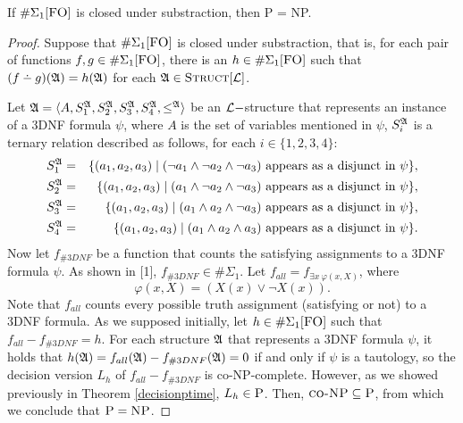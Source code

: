 \begin{theo}
If $\E1$ is closed under substraction, then {\sc P} = {\sc NP}.
\end{theo}
\begin{proof}
Suppose that $\E1$ is closed under substraction, that is, for each pair of functions $f,g\in \E1$, there is an $h\in\E1$ such that $(f\dotminus g)(\A) = h(\A)$ for each ${\frak A}\in\textsc{Struct}[{\cal L}]$.

Let ${\frak A} = \langle A, S_1^{\frak A}, S_2^{\frak A}, S_3^{\frak A}, S_4^{\frak A}, \leq^{\frak A} \rangle$ be an ${\cal L}-$structure that represents an instance of a 3DNF formula $\psi$, where $A$ is the set of variables mentioned in $\psi$, $S_i^{\frak A}$ is a ternary relation described as follows, for each $i\in\{1,2,3,4\}$:
\begin{eqnarray*}
S_1^{\frak A} &=& \{(a_1,a_2,a_3)\mid (\neg a_1 \wedge \neg a_2 \wedge \neg a_3) \mbox{ appears as a disjunct in }\psi\},\\
S_2^{\frak A} &=& \{(a_1,a_2,a_3)\mid ( a_1 \wedge \neg a_2 \wedge \neg a_3) \mbox{ appears as a disjunct in }\psi\},\\
S_3^{\frak A} &=& \{(a_1,a_2,a_3)\mid ( a_1 \wedge  a_2 \wedge \neg a_3) \mbox{ appears as a disjunct in }\psi\},\\
S_4^{\frak A} &=& \{(a_1,a_2,a_3)\mid ( a_1 \wedge  a_2 \wedge  a_3) \mbox{ appears as a disjunct in }\psi\}.
\end{eqnarray*}
Now let $f_{\#3DNF}$ be a function that counts the satisfying assignments to a 3DNF formula $\psi$. As shown in [1], $f_{\#3DNF} \in \#\Sigma_1$. Let $f_{all} = f_{\exists x\:\varphi(x,X)}$, where
$$
\varphi(x,X) = (X(x) \vee \neg X(x)).
$$
Note that $f_{all}$ counts every possible truth assignment (satisfying or not) to a 3DNF formula. As we supposed initially, let $h\in\E1$ such that $f_{all}-f_{\#3DNF} = h$. For each structure ${\frak A}$ that represents a 3DNF formula $\psi$, it holds that $h({\frak A}) = f_{all}({\frak A})-f_{\#3DNF}({\frak A}) = 0$ if and only if $\psi$ is a tautology, so the decision version $L_h$ of $f_{all}-f_{\#3DNF}$ is {\sc co-NP}-complete. However, as we showed previously in Theorem \ref{decisionptime}, $L_h \in \textsc{P}$. Then, $\textsc{co-NP} \subseteq \textsc{P}$, from which we conclude that $\textsc{P} = \textsc{NP}$.
\end{proof}